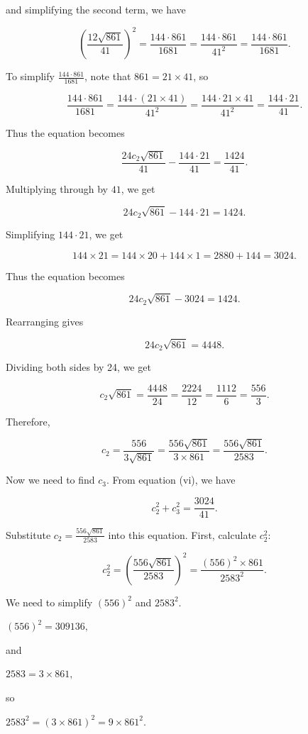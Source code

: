 and simplifying the second term, we have

\[ \left(\frac{12 \sqrt{861}}{41}\right)^2 = \frac{144 \cdot 861}{1681} = \frac{144 \cdot 861}{41^2} = \frac{144 \cdot 861}{1681}. \]

To simplify $\frac{144 \cdot 861}{1681}$, note that $861 = 21 \times 41$, so

\[ \frac{144 \cdot 861}{1681} = \frac{144 \cdot (21 \times 41)}{41^2} = \frac{144 \cdot 21 \times 41}{41^2} = \frac{144 \cdot 21}{41}. \]

Thus the equation becomes

\[ \frac{24 c_2 \sqrt{861}}{41} - \frac{144 \cdot 21}{41} = \frac{1424}{41}. \]

Multiplying through by $41$, we get

\[ 24 c_2 \sqrt{861} - 144 \cdot 21 = 1424. \]

Simplifying $144 \cdot 21$, we get

\[ 144 \times 21 = 144 \times 20 + 144 \times 1 = 2880 + 144 = 3024. \]

Thus the equation becomes

\[ 24 c_2 \sqrt{861} - 3024 = 1424. \]

Rearranging gives

\[ 24 c_2 \sqrt{861} = 4448. \]

Dividing both sides by 24, we get

\[ c_2 \sqrt{861} = \frac{4448}{24} = \frac{2224}{12} = \frac{1112}{6} = \frac{556}{3}. \]

Therefore,

\[ c_2 = \frac{556}{3 \sqrt{861}} = \frac{556 \sqrt{861}}{3 \times 861} = \frac{556 \sqrt{861}}{2583}. \]

Now we need to find $c_3$. From equation (vi), we have

\[ c_2^2 + c_3^2 = \frac{3024}{41}. \]

Substitute $c_2 = \frac{556 \sqrt{861}}{2583}$ into this equation. First, calculate $c_2^2$:

\[ c_2^2 = \left(\frac{556 \sqrt{861}}{2583}\right)^2 = \frac{(556)^2 \times 861}{2583^2}. \]

We need to simplify $(556)^2$ and $2583^2$.

$(556)^2 = 309136,$

and 

$2583 = 3 \times 861,$

so 

$2583^2 = (3 \times 861)^2 = 9 \times 861^2.$

